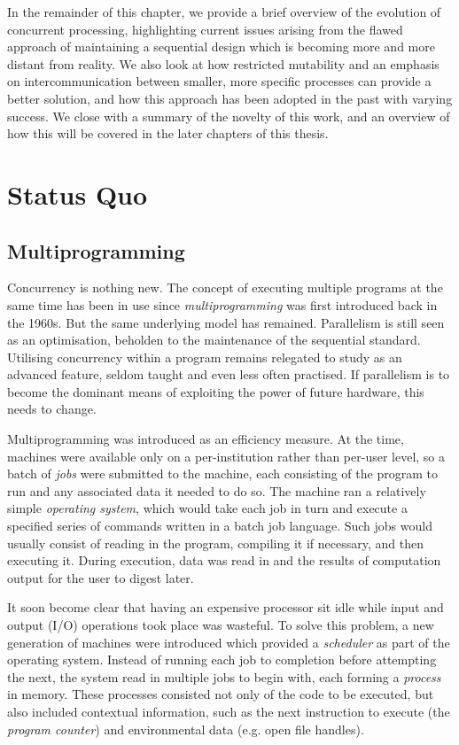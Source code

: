 In the remainder of this chapter, we provide a brief overview of the
evolution of concurrent processing, highlighting current issues
arising from the flawed approach of maintaining a sequential design
which is becoming more and more distant from reality.  We also look at
how restricted mutability and an emphasis on intercommunication
between smaller, more specific processes can provide a better
solution, and how this approach has been adopted in the past with
varying success.  We close with a summary of the novelty of this work,
and an overview of how this will be covered in the later chapters of
this thesis.

\section{Status Quo}

\subsection{Multiprogramming}

Concurrency is nothing new.  The concept of executing multiple
programs at the same time has been in use since
\emph{multiprogramming} was first introduced back in the 1960s.  But
the same underlying model has remained.  Parallelism is still seen as
an optimisation, beholden to the maintenance of the sequential
standard.  Utilising concurrency within a program remains relegated to
study as an advanced feature, seldom taught and even less often
practised.  If parallelism is to become the dominant means of
exploiting the power of future hardware, this needs to change.

Multiprogramming was introduced as an efficiency measure.  At the
time, machines were available only on a per-institution rather than
per-user level, so a batch of \emph{jobs} were submitted to the
machine, each consisting of the program to run and any associated data
it needed to do so.  The machine ran a relatively simple
\emph{operating system}, which would take each job in turn and execute
a specified series of commands written in a batch job language.  Such
jobs would usually consist of reading in the program, compiling it if
necessary, and then executing it.  During execution, data was read in
and the results of computation output for the user to digest later.

It soon become clear that having an expensive processor sit idle while
input and output (I/O) operations took place was wasteful.  To solve
this problem, a new generation of machines were introduced which
provided a \emph{scheduler} as part of the operating system.  Instead
of running each job to completion before attempting the next, the
system read in multiple jobs to begin with, each forming a
\emph{process} in memory.  These processes consisted not only of the
code to be executed, but also included contextual information, such as
the next instruction to execute (the \emph{program counter})
and environmental data (e.g. open file handles).

